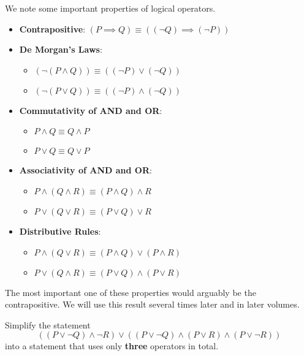 We note some important properties of logical operators.
\begin{itemize}
    \item \textbf{Contrapositive}: $(P \implies Q) \equiv ((\lnot Q) \implies (\lnot P))$
    \item \textbf{De Morgan's Laws}: \begin{itemize}
        \item $(\lnot (P \land Q)) \equiv ((\lnot P) \lor (\lnot Q))$
        \item $(\lnot (P \lor Q)) \equiv ((\lnot P) \land (\lnot Q))$
    \end{itemize}
    \item \textbf{Commutativity of AND and OR}: \begin{itemize}
        \item $P \land Q \equiv Q \land P$
        \item $P \lor Q \equiv Q \lor P$
    \end{itemize}
    \item \textbf{Associativity of AND and OR}: \begin{itemize}
        \item $P \land (Q \land R) \equiv (P \land Q) \land R$
        \item $P \lor (Q \lor R) \equiv (P \lor Q) \lor R$
    \end{itemize}
    \item \textbf{Distributive Rules}: \begin{itemize}
        \item $P \land (Q \lor R) \equiv (P \land Q) \lor (P \land R)$
        \item $P \lor (Q \land R) \equiv (P \lor Q) \land (P \lor R)$
    \end{itemize}
\end{itemize}
\begin{remark}
    The most important one of these properties would arguably be the contrapositive. We will use this result several times later and in later volumes.
\end{remark}
\begin{exercise}
    Simplify the statement
    \[
        ((P \lor \lnot Q) \land \lnot R) \lor ((P \lor \lnot Q) \land (P \lor R) \land (P \lor \lnot R))
    \]
    into a statement that uses only \textbf{three} operators in total.
\end{exercise}

